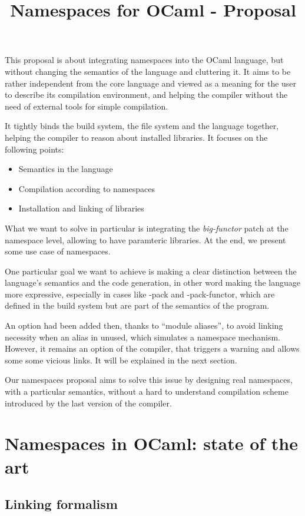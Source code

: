 \documentclass[11pt,a4paper]{article}
\title{Namespaces for OCaml - Proposal}
\begin{document}
\maketitle

This proposal is about integrating namespaces into the OCaml language, but
without changing the semantics of the language and cluttering it. It aims to be
rather independent from the core language and viewed as a meaning for the user to
describe its compilation environment, and helping the compiler without the need
of external tools for simple compilation.

It tightly binds the build system, the file system and the language together,
helping the compiler to reason about installed libraries.
It focuses on the following points:
\begin{itemize}
\item Semantics in the language
\item Compilation according to namespaces
\item Installation and linking of libraries
\end{itemize}

What we want to solve in particular is integrating the \emph{big-functor} patch
at the namespace level, allowing to have paramteric libraries. At the end, we
present some use case of namespaces.

One particular goal we want to achieve is making a clear distinction between the
language's semantics and the code generation, in other word making the language
more expressive, especially in cases like -pack and -pack-functor, which are
defined in the build system but are part of the semantics of the program.

An option had been added then, thanks to ``module aliases'', to avoid linking
necessity when an alias in unused, which simulates a namespace
mechanism. However, it remains an option of the compiler, that triggers a
warning and allows some some vicious links. It will be explained in the next
section.

Our namespaces proposal aims to solve this issue by designing real namespaces,
with a particular semantics, without a hard to understand compilation scheme
introduced by the last version of the compiler.

\section{Namespaces in OCaml: state of the art}

\subsection{Linking formalism}
\end{document}
